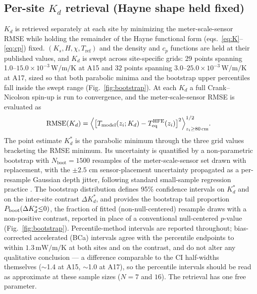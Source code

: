 \documentclass[11pt]{article}
\newcommand{\zborestem}{80\,\si{\centi\meter}}
\begin{document}
\subsection{Per-site $K_d$ retrieval (Hayne shape held fixed)}%
\label{sec:methods-kd}
$K_d$ is retrieved separately at each site by minimizing the
meter-scale-sensor RMSE while holding the remainder
of the Hayne functional form (eqs.~\ref{eq:K}--\ref{eq:cp}) fixed.
$(K_s,H,\chi,T_\mathrm{ref})$ and the density and $c_p$ functions are held
at their published values, and $K_d$ is swept across site-specific grids:
29 points spanning
1.0--$15.0\times10^{-3}\,\si{\watt\per\meter\per\kelvin}$ at A15 and 32
points spanning
3.0--$25.0\times10^{-3}\,\si{\watt\per\meter\per\kelvin}$ at A17, sized so
that both parabolic minima and the bootstrap upper percentiles fall inside
the swept range (Fig.~\ref{fig:bootstrap}).
 At each $K_d$ a full Crank--Nicolson spin-up is
run to convergence, and the
meter-scale-sensor RMSE is evaluated as
\begin{equation}
\mathrm{RMSE}(K_d) = \Bigl\langle\bigl[T_\mathrm{model}(z_i;K_d) - T_\mathrm{eq}^\mathrm{HFE}(z_i)\bigr]^2\Bigr\rangle_{z_i\ge\zborestem}^{1/2}.
\label{eq:rmse-kd}
\end{equation}
The point estimate $K_d^{*}$ is the parabolic minimum through the three
grid values bracketing the RMSE minimum. Its uncertainty is
quantified by a non-parametric bootstrap with $N_\mathrm{boot}=1500$
resamples of the meter-scale-sensor set drawn with
replacement, with the $\pm 2.5$ cm sensor-placement uncertainty
\citep{nagihara2018} propagated as a per-resample Gaussian depth jitter,
following standard small-sample regression practice \citep{press2007}. The
bootstrap distribution defines 95\% confidence intervals on $K_d^{*}$ and
on the inter-site contrast $\Delta K_d^{*}$, and provides the
bootstrap tail
proportion $P_{\rm boot}(\Delta K_d^{*}{\le}0)$, the fraction of
fitted (non-null-centered) resample draws with a non-positive contrast,
reported in place of a conventional null-centered $p$-value
(Fig.~\ref{fig:bootstrap}).
Percentile-method intervals are reported throughout; bias-corrected
accelerated (BCa) intervals \citep{efron1993} agree with the percentile
endpoints to within $1.3\,\si{\milli\watt\per\meter\per\kelvin}$ at both
sites and on the contrast, and do not alter any qualitative conclusion
--- a difference comparable to the CI half-widths themselves
($\sim$1.4 at A15, $\sim$1.0 at A17), so the percentile intervals
should be read as approximate at these sample sizes ($N=7$ and $16$). The
retrieval has one free parameter.
\end{document}
